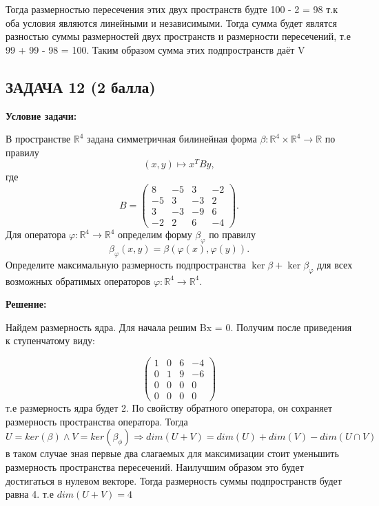 \documentclass[a4paper,12pt]{article}
\begin{document}
Тогда размерностью пересечения этих двух пространств будте 100 - 2 = 98 т.к оба условия являются линейными и независимыми. Тогда сумма будет являтся разностью суммы размерностей двух пространств и размерности пересечений, т.е 99 + 99 - 98  = 100. Таким образом сумма этих подпространств даёт V

\vspace{1cm}

\subsection{ЗАДАЧА 12 \hfill \textbf{(2 балла)}}
\textbf{Условие задачи:}

В пространстве \( \mathbb{R}^4 \) задана симметричная билинейная форма \( \beta: \mathbb{R}^4 \times \mathbb{R}^4 \to \mathbb{R} \) по правилу
\[
(x, y) \mapsto x^T By,
\]
где
\[
B =
\begin{pmatrix}
8 & -5 & 3 & -2 \\
-5 & 3 & -3 & 2 \\
3 & -3 & -9 & 6 \\
-2 & 2 & 6 & -4
\end{pmatrix}.
\]
Для оператора \( \varphi: \mathbb{R}^4 \to \mathbb{R}^4 \) определим форму \( \beta_\varphi \) по правилу
\[
\beta_\varphi(x, y) = \beta(\varphi(x), \varphi(y)).
\]
Определите максимальную размерность подпространства \( \ker \beta + \ker \beta_\varphi \) для всех возможных обратимых операторов \( \varphi: \mathbb{R}^4 \to \mathbb{R}^4 \).

\textbf{Решение:}

Найдем размерность ядра. Для начала решим Bx = 0. Получим после приведения к ступенчатому виду:

\[
\begin{pmatrix}
    1& 0 &6& -4 \\
    0 &1 &9& -6 \\
    0& 0 &0 &0 \\
    0 &0& 0 &0
\end{pmatrix}
\] т.е размерность ядра будет 2. По свойству обратного оператора, он сохраняет размерность пространства оператора. Тогда $U = ker(\beta) \land V = ker(\beta_\phi) \Rightarrow dim(U+V) = dim(U) + dim(V) - dim(U\cap V) $ в таком случае зная первые два слагаемых для максимизации стоит уменьшить размерность пространства пересечений. Наилучшим образом это будет достигаться в нулевом векторе. Тогда размерность суммы подпространств будет равна 4. т.е $dim(U + V) = 4$

\vspace{1cm}
\end{document}
